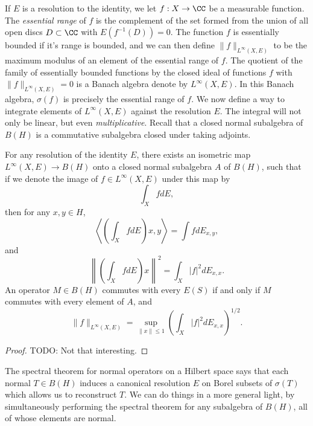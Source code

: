 If $E$ is a resolution to the identity, we let $f: X \to \CC$ be a measurable function. The \emph{essential range} of $f$ is the complement of the set formed from the union of all open discs $D \subset \CC$ with $E(f^{-1}(D)) = 0$. The function $f$ is essentially bounded if it's range is bounded, and we can then define $\| f \|_{L^\infty(X,E)}$ to be the maximum modulus of an element of the essential range of $f$. The quotient of the family of essentially bounded functions by the closed ideal of functions $f$ with $\| f \|_{L^\infty(X,E)} = 0$ is a Banach algebra denote by $L^\infty(X,E)$. In this Banach algebra, $\sigma(f)$ is precisely the essential range of $f$. We now define a way to integrate elements of $L^\infty(X,E)$ against the resolution $E$. The integral will not only be linear, but even \emph{multiplicative}. Recall that a closed normal subalgebra of $B(H)$ is a commutative subalgebra closed under taking adjoints.

\begin{theorem}
    For any resolution of the identity $E$, there exists an isometric map $L^\infty(X,E) \to B(H)$ onto a closed normal subalgebra $A$ of $B(H)$, such that if we denote the image of $f \in L^\infty(X,E)$ under this map by
    \[ \int_X f dE, \]
    then for any $x,y \in H$,
    \[ \left\langle \left(\int_X f dE \right) x, y \right\rangle = \int f dE_{x,y}, \]
    and
    \[ \left\| \left( \int_X f dE \right) x \right\|^2 = \int_X |f|^2 dE_{x,x}. \]
    An operator $M \in B(H)$ commutes with every $E(S)$ if and only if $M$ commutes with every element of $A$, and
    \[ \| f \|_{L^\infty(X,E)} = \sup_{\| x \| \leq 1} \left( \int_X |f|^2 dE_{x,x} \right)^{1/2}. \]
\end{theorem}
\begin{proof}
    TODO: Not that interesting.
\end{proof}

The spectral theorem for normal operators on a Hilbert space says that each normal $T \in B(H)$ induces a canonical resolution $E$ on Borel subsets of $\sigma(T)$ which allows us to reconstruct $T$. We can do things in a more general light, by simultaneously performing the spectral theorem for any subalgebra of $B(H)$, all of whose elements are normal.

